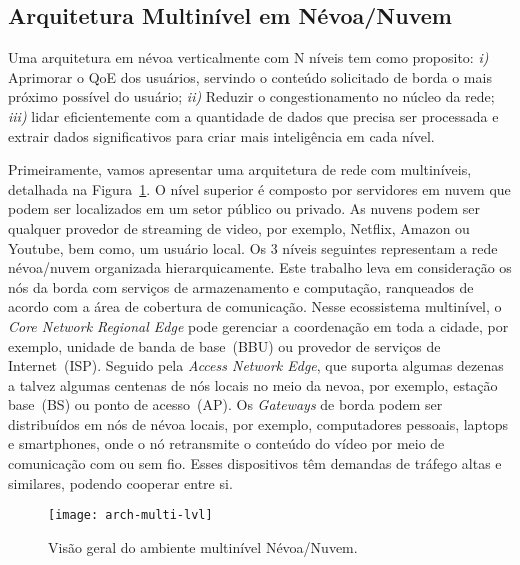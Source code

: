 \subsection{Arquitetura Multinível em Névoa/Nuvem}


Uma arquitetura em névoa verticalmente com N níveis tem como proposito: 
\textit{i)} Aprimorar o QoE dos usuários, servindo o conteúdo solicitado de borda o mais próximo possível do usuário;
\textit{ii)} Reduzir o congestionamento no núcleo da rede;
\textit{iii)} lidar eficientemente com a quantidade de dados que precisa ser processada e extrair dados significativos para criar mais inteligência em cada nível. 
%

Primeiramente, vamos apresentar uma arquitetura de rede com multiníveis, detalhada na Figura~\ref{fig:arch-multi-lvl}. O nível superior é composto por servidores em nuvem que podem ser localizados em um setor público ou privado. As nuvens podem ser qualquer provedor de streaming de video, por exemplo, Netflix, Amazon ou Youtube, bem como, um usuário local. %
Os 3 níveis seguintes representam a rede névoa/nuvem organizada hierarquicamente. Este  trabalho leva em consideração os nós da borda com serviços de armazenamento e computação, ranqueados de acordo com a área de cobertura de comunicação. Nesse ecossistema multinível, o \textit{Core Network Regional Edge} pode gerenciar a coordenação em toda a cidade, por exemplo, unidade de banda de base~(BBU) ou provedor de serviços de Internet~(ISP). Seguido pela \textit{Access Network Edge}, que suporta algumas dezenas a talvez algumas centenas de nós locais no meio da nevoa, por exemplo, estação base~(BS) ou ponto de acesso~(AP). Os \textit{Gateways} de borda podem ser distribuídos em nós de névoa locais, por exemplo, computadores pessoais, laptops e smartphones, onde o nó retransmite o conteúdo do vídeo por meio de comunicação com ou sem fio. Esses dispositivos têm demandas de tráfego altas e similares, podendo cooperar entre si.%
\vspace{0.8cm}
\begin{figure}[htb]
  \centering
  \texttt{[image: arch-multi-lvl]}
  \caption{Visão geral do ambiente multinível Névoa/Nuvem.}
  \label{fig:arch-multi-lvl}
\end{figure}

